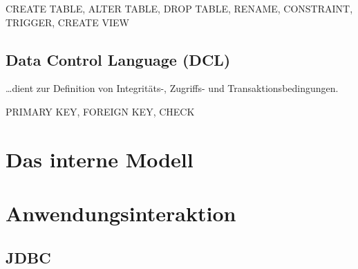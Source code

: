 CREATE TABLE, ALTER TABLE, DROP TABLE, RENAME, CONSTRAINT, TRIGGER, CREATE VIEW

\section{Data Control Language (DCL)}

\ldots dient zur Definition von Integritäts-, Zugriffs- und Transaktionsbedingungen.

PRIMARY KEY, FOREIGN KEY, CHECK


\chapter{Das interne Modell}


\chapter{Anwendungsinteraktion}


\section{JDBC}
